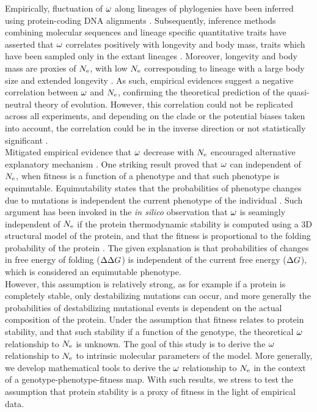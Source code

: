 \documentclass{article}
\begin{document}
Empirically, fluctuation of $\omega$ along lineages of phylogenies have been inferred using protein-coding DNA alignments \cite{Yang2001, Zhang2004}.
Subsequently, inference methods combining molecular sequences and lineage specific quantitative traits have asserted that $\omega$ correlates positively with longevity and body mass, traits which have been sampled only in the extant lineages \cite{Lartillot2011,Weber2014}.
Moreover, longevity and body mass are proxies of $N_{\mathrm{e}}$, with low $N_{\mathrm{e}}$ corresponding to lineage with a large body size and extended longevity \cite{Romiguier2014}.
As such, empirical evidences suggest a negative correlation between $\omega$ and $N_{\mathrm{e}}$, confirming the theoretical prediction of the quasi-neutral theory of evolution.
However, this correlation could not be replicated across all experiments, and depending on the clade or the potential biases taken into account, the correlation could be in the inverse direction or not statistically significant \cite{Figuet2016}.\\

Mitigated empirical evidence that $\omega$ decrease with $N_{\mathrm{e}}$ encouraged alternative explanatory mechanism \cite{Lanfear2014}.
One striking result proved that $\omega$ can independent of $N_{\mathrm{e}}$, when fitness is a function of a phenotype and that such phenotype is equimutable.
Equimutability states that the probabilities of phenotype changes due to mutations is independent the current phenotype of the individual \cite{Cherry1998}.
Such argument has been invoked in the \textit{in silico} observation that $\omega$ is seamingly independent of $N_{\mathrm{e}}$ if the protein thermodynamic stability is computed using a 3D structural model of the protein, and that the fitness is proportional to the folding probability of the protein \cite{Goldstein2013}.
The given explanation is that probabilities of changes in free energy of folding ($\Delta \Delta G$) is independent of the current free energy ($\Delta G$), which is considered an equimutable phenotype.\\

However, this assumption is relatively strong, as for example if a protein is completely stable, only destabilizing mutations can occur, and more generally the probabilities of destabilizing mutational events is dependent on the actual composition of the protein.
Under the assumption that fitness relates to protein stability, and that such stability if a function of the genotype, the theoretical $\omega$ relationship to $N_{\mathrm{e}}$ is unknown.
The goal of this study is to derive the $\omega$ relationship to $N_{\mathrm{e}}$ to intrinsic molecular parameters of the model.
More generally, we develop mathematical tools to derive the $\omega$ relationship to $N_{\mathrm{e}}$ in the context of a genotype-phenotype-fitness map.
With such results, we stress to test the assumption that protein stability is a proxy of fitness in the light of empirical data.\\
\end{document}
